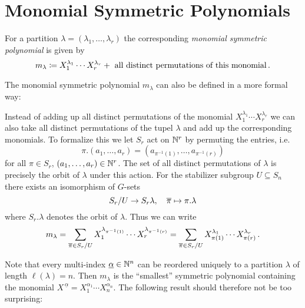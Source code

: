 \section{Monomial Symmetric Polynomials}

\begin{definition}
  For a partition $\lambda = (\lambda_1, \dotsc, \lambda_r)$ the corresponding \emph{monomial symmetric polynomial} is given by
  \[
              m_\lambda
    \coloneqq    X_1^{\lambda_1} \dotsm X_r^{\lambda_r}
              + \text{ all distinct permutations of this monomial} \,.
  \]
\end{definition}


\begin{remark}
  The monomial symmetric polynomial $m_\lambda$ can also be defined in a more formal way:
  
  Instead of adding up all distinct permutations of the monomial $X_1^{\lambda_1} \dotsm X_r^{\lambda_r}$ we can also take all distinct permutations of the tupel $\lambda$ and add up the corresponding monomials.
  To formalize this we let $S_r$ act on $\mathbb{N}^r$ by permuting the entries, i.e.\
  \[
      \pi.(a_1, \dotsc, a_r)
    = ( a_{\pi^{-1}(1)}, \dotsc, a_{\pi^{-1}(r)} )
  \]
  for all $\pi \in S_r$, $(a_1, \dotsc, a_r) \in \mathbb{N}^r$.
  The set of all distinct permutations of $\lambda$ is precisely the orbit of $\lambda$ under this action.
  For the stabilizer subgroup $U \subseteq S_n$ there exists an isomorphism of $G$-sets
  \[
            S_r / U
    \to     S_r \lambda,
    \quad   \overline{\pi}
    \mapsto \pi.\lambda
  \]
  where $S_r.\lambda$ denotes the orbit of $\lambda$.
  Thus we can write
  \[
      m_\lambda
    = \sum_{\overline{\pi} \in S_r/U} X_1^{\lambda_{\pi^{-1}(1)}} \dotsm X_r^{\lambda_{\pi^{-1}(r)}}
    = \sum_{\overline{\pi} \in S_r/U} X_{\pi(1)}^{\lambda_1} \dotsm X_{\pi(r)}^{\lambda_r} \,.
  \]
\end{remark}


\begin{fluff}
  Note that every multi-index $\underline{\alpha} \in \mathbb{N}^n$ can be reordered uniquely to a partition $\lambda$ of length $\ell(\lambda) = n$.
  Then $m_\lambda$ is the “smallest” symmetric polynomial containing the monomial $X^{\,\underline{\alpha}} = X_1^{\alpha_1} \dotsm X_n^{\alpha_n}$.
  The following result should therefore not be too surprising:
\end{fluff}


